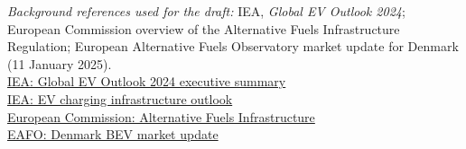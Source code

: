 \documentclass[10pt]{article}
\begin{document}
\vfill
\footnotesize
\textit{Background references used for the draft:} IEA, \emph{Global EV Outlook 2024}; European Commission overview of the Alternative Fuels Infrastructure Regulation; European Alternative Fuels Observatory market update for Denmark (11 January 2025).\\
\href{https://www.iea.org/reports/global-ev-outlook-2024/executive-summary}{IEA: Global EV Outlook 2024 executive summary} \\
\href{https://www.iea.org/reports/global-ev-outlook-2024/outlook-for-electric-vehicle-charging-infrastructure}{IEA: EV charging infrastructure outlook} \\
\href{https://transport.ec.europa.eu/transport-themes/clean-transport/alternative-fuels-sustainable-mobility-europe/alternative-fuels-infrastructure_en}{European Commission: Alternative Fuels Infrastructure} \\
\href{https://alternative-fuels-observatory.ec.europa.eu/general-information/news/denmark-bevs-take-over-2024-515-market-share}{EAFO: Denmark BEV market update}
\end{document}
